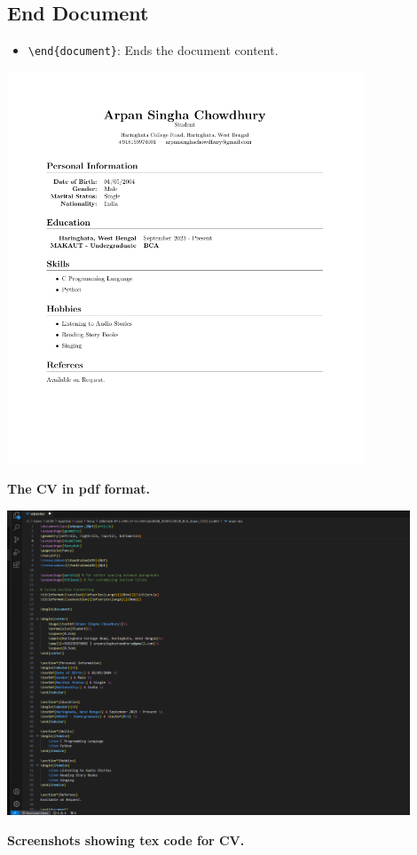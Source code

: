 \documentclass[a4paper,12pt]{article}
\begin{document}
\subsection{End Document}
\begin{itemize}
    \item \texttt{\textbackslash end\{document\}}: Ends the document content.
    \end{itemize}
\includegraphics[width=0.8\textwidth]{arpancv.png}
\par\vspace{2em}
\large\textbf{The CV in pdf format.}
\par\vspace{2em}
\includegraphics[width=0.9\textwidth]{arpancvtex.png}
\par\vspace{2em}
\large\textbf{Screenshots showing tex code for CV.}
\vspace{0.3in}
\newpage
\end{document}

